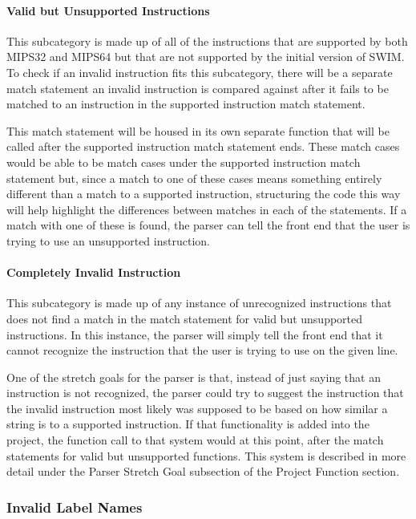 \documentclass[
    parskip=half,
    fontsize=12pt,
    titlepage=firstiscover,
    toc=bibliography,
    numbers=endperiod
]{scrartcl}
\begin{document}
\paragraph{Valid but Unsupported Instructions}

This subcategory is made up of all of the instructions that are
supported by both MIPS32 and MIPS64 but that are not supported by the
initial version of SWIM. To check if an invalid instruction fits this
subcategory, there will be a separate match statement an invalid
instruction is compared against after it fails to be matched to an
instruction in the supported instruction match statement.

This match statement will be housed in its own separate function that
will be called after the supported instruction match statement ends.
These match cases would be able to be match cases under the supported
instruction match statement but, since a match to one of these cases
means something entirely different than a match to a supported
instruction, structuring the code this way will help highlight the
differences between matches in each of the statements. If a match with
one of these is found, the parser can tell the front end that the user
is trying to use an unsupported instruction.

\paragraph{Completely Invalid Instruction}

This subcategory is made up of any instance of unrecognized instructions
that does not find a match in the match statement for valid but
unsupported instructions. In this instance, the parser will simply tell
the front end that it cannot recognize the instruction that the user is
trying to use on the given line.

One of the stretch goals for the parser is that, instead of just saying
that an instruction is not recognized, the parser could try to suggest
the instruction that the invalid instruction most likely was supposed to
be based on how similar a string is to a supported instruction. If that
functionality is added into the project, the function call to that
system would at this point, after the match statements for valid but
unsupported functions. This system is described in more detail under the
Parser Stretch Goal subsection of the Project Function section.

\subsubsection{Invalid Label Names}
\end{document}

